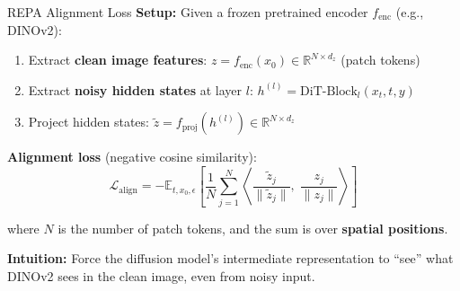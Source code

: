 \documentclass[aspectratio=169, 10pt]{beamer}
\newcommand{\loss}{\mathcal{L}}
\newcommand{\E}{\mathbb{E}}
\newcommand{\R}{\mathbb{R}}
\begin{document}
\begin{frame}{REPA Alignment Loss}
\textbf{Setup:} Given a frozen pretrained encoder $f_{\text{enc}}$ (e.g., DINOv2):

\vspace{0.3em}
\begin{enumerate}
  \item Extract \textbf{clean image features}: $z = f_{\text{enc}}(x_0) \in \R^{N \times d_z}$ \quad (patch tokens)
  \item Extract \textbf{noisy hidden states} at layer $l$: $h^{(l)} = \text{DiT-Block}_l(x_t, t, y)$
  \item Project hidden states: $\tilde{z} = f_{\text{proj}}(h^{(l)}) \in \R^{N \times d_z}$
\end{enumerate}

\vspace{0.5em}
\textbf{Alignment loss} (negative cosine similarity):
\begin{equation}
  \loss_{\text{align}} = - \E_{t, x_0, \epsilon}\left[
    \frac{1}{N} \sum_{j=1}^{N}
    \left\langle
      \frac{\tilde{z}_j}{\|\tilde{z}_j\|},\;
      \frac{z_j}{\|z_j\|}
    \right\rangle
  \right]
\end{equation}

where $N$ is the number of patch tokens, and the sum is over \textbf{spatial positions}.

\vspace{0.5em}
\textbf{Intuition:} Force the diffusion model's intermediate representation to ``see'' what DINOv2 sees in the clean image, even from noisy input.
\end{frame}
\end{document}
